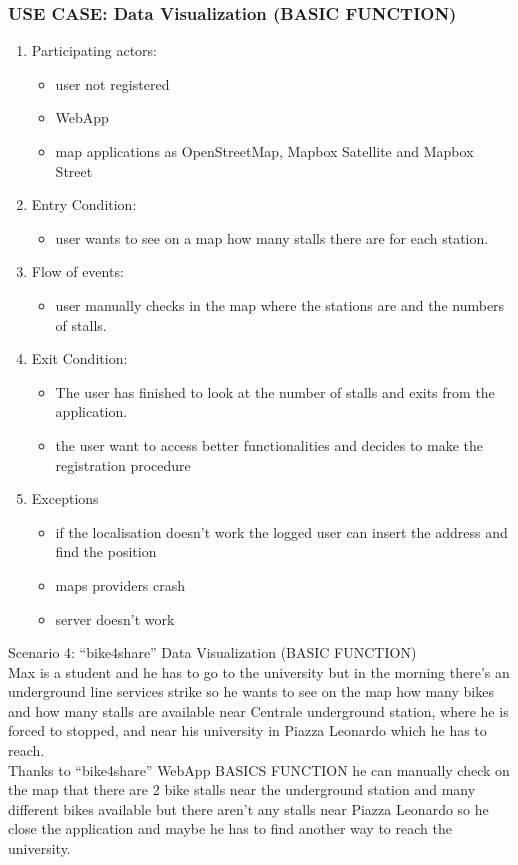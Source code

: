 \documentclass{article}
\begin{document}
\subsubsection{\textbf{USE CASE}: Data Visualization (BASIC FUNCTION)}
\begin{enumerate}
\item Participating actors: 
\begin{itemize}
    \item user not registered
    \item WebApp
    \item map applications as OpenStreetMap, Mapbox Satellite and Mapbox Street 
\end{itemize}
\item Entry Condition: 
\begin{itemize}
    \item user wants to see on a map how many stalls there are  for each station.
\end{itemize}
\item Flow of events: 
\begin{itemize}
    \item user manually checks in the map where the stations are and the numbers of stalls.
\end{itemize}
\item Exit Condition: 
\begin{itemize}
    \item The user has finished to look at the number of stalls and exits from the application. 
    \item the user want to access better functionalities and decides to make the registration procedure
\end{itemize}
\item Exceptions
\begin{itemize}
    \item if the localisation doesn’t work the logged user can insert the address and find the position
    \item maps providers crash
    \item server doesn’t work
\end{itemize}
\end{enumerate}

Scenario 4: “bike4share” Data Visualization (BASIC FUNCTION) \\
Max is a student and he has to go to the university but in the morning there’s an underground line services strike so he wants to see on the map how many bikes and how many stalls are available near Centrale underground station, where he is forced to stopped, and near his university in Piazza Leonardo which he has to reach.\\ 
Thanks to “bike4share” WebApp BASICS FUNCTION he can manually check on the map that there are 2 bike stalls near the underground station and many different bikes available but there aren’t any stalls near Piazza Leonardo so he close the application and maybe he has to find another way to reach the university.
\end{document}
